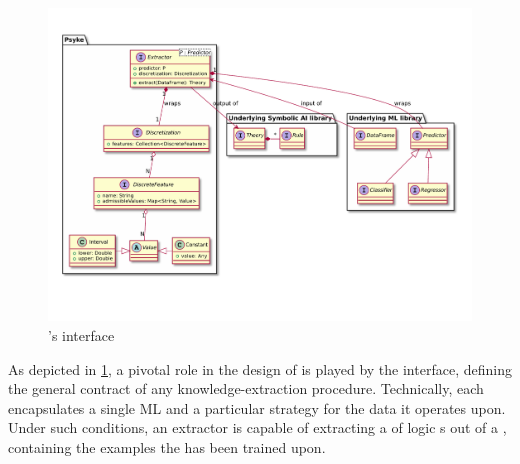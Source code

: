 \documentclass[12pt,a4paper,openright,twoside]{book}
\begin{document}
\begin{figure}
    \centering
    \includegraphics[width=\linewidth]{figures/extractor-api.pdf}
    \caption{\psyke{}'s  interface}
    \label{fig:extractor-api}
\end{figure}

As depicted in \cref{fig:extractor-api}, a pivotal role in the design of \psyke{} is played by the  interface, defining the general contract of any knowledge-extraction procedure.
%
Technically, each  encapsulates a single ML  and a particular  strategy for the data it operates upon.
%
Under such conditions, an extractor is capable of extracting a  of logic s out of a , containing the examples the  has been trained upon.
\end{document}
